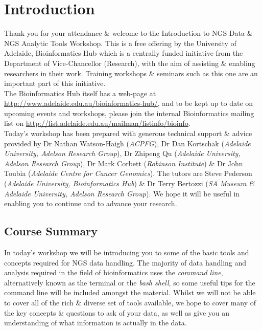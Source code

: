 \chapter{Introduction}

Thank you for your attendance \& welcome to the Introduction to NGS Data \& NGS Analytic Tools Workshop.
This is a free offering by the University of Adelaide, Bioinformatics Hub which is a centrally funded initiative from the Department of Vice-Chancellor (Research), with the aim of assisting \& enabling researchers in their work.
Training workshops \& seminars such as this one  are an important part of this initiative. \\

The Bioinformatics Hub itself has a web-page at \url{http://www.adelaide.edu.au/bioinformatics-hub/}, and to be kept up to date on upcoming events and workshops, please join the internal Bioinformatics mailing list on \url{http://list.adelaide.edu.au/mailman/listinfo/bioinfo}.\\

Today's workshop has been prepared with generous technical support \& advice provided by Dr Nathan Watson-Haigh (\textit{ACPFG}), Dr Dan Kortschak (\textit{Adelaide University, Adelson Research Group}), Dr Zhipeng Qu (\textit{Adelaide University, Adelson Research Group}), Dr Mark Corbett (\textit{Robinson Institute}) \& Dr John Toubia (\textit{Adelaide Centre for Cancer Genomics}). 
The tutors are Steve Pederson (\textit{Adelaide University, Bioinformatics Hub}) \& Dr Terry Bertozzi (\textit{SA Museum \& Adelaide University, Adelson Research Group}). 
We hope it will be useful in enabling you to continue and to advance your research.\\

\section{Course Summary}
In today's workshop we will be introducing you to some of the basic tools and concepts required for NGS data handling.
The majority of data handling and analysis required in the field of bioinformatics uses the \textit{command line}, alternatively known as the terminal or the \textit{bash shell}, so some useful tips for the command line will be included amongst the material.
Whilst we will not be able to cover all of the rich \& diverse set of tools available, we hope to cover many of the key concepts \& questions to ask of your data, as well as give you an understanding of what information is actually in the data.\\

